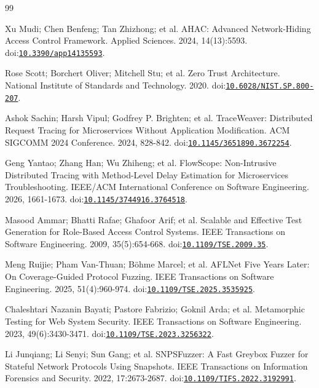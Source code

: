 \begin{thebibliography}{99}

Xu Mudi; Chen Benfeng; Tan Zhizhong; et al. AHAC: Advanced Network-Hiding Access Control Framework. Applied Sciences. 2024, 14(13):5593. doi:\href{https://doi.org/10.3390/app14135593}{\nolinkurl{10.3390/app14135593}}.

Rose Scott; Borchert Oliver; Mitchell Stu; et al. Zero Trust Architecture. National Institute of Standards and Technology. 2020. doi:\href{https://doi.org/10.6028/NIST.SP.800-207}{\nolinkurl{10.6028/NIST.SP.800-207}}.

Ashok Sachin; Harsh Vipul; Godfrey P. Brighten; et al. TraceWeaver: Distributed Request Tracing for Microservices Without Application Modification. ACM SIGCOMM 2024 Conference. 2024, 828-842. doi:\href{https://doi.org/10.1145/3651890.3672254}{\nolinkurl{10.1145/3651890.3672254}}.

Geng Yantao; Zhang Han; Wu Zhiheng; et al. FlowScope: Non-Intrusive Distributed Tracing with Method-Level Delay Estimation for Microservices Troubleshooting. IEEE/ACM International Conference on Software Engineering. 2026, 1661-1673. doi:\href{https://doi.org/10.1145/3744916.3764518}{\nolinkurl{10.1145/3744916.3764518}}.

Masood Ammar; Bhatti Rafae; Ghafoor Arif; et al. Scalable and Effective Test Generation for Role-Based Access Control Systems. IEEE Transactions on Software Engineering. 2009, 35(5):654-668. doi:\href{https://doi.org/10.1109/TSE.2009.35}{\nolinkurl{10.1109/TSE.2009.35}}.

Meng Ruijie; Pham Van-Thuan; Böhme Marcel; et al. AFLNet Five Years Later: On Coverage-Guided Protocol Fuzzing. IEEE Transactions on Software Engineering. 2025, 51(4):960-974. doi:\href{https://doi.org/10.1109/TSE.2025.3535925}{\nolinkurl{10.1109/TSE.2025.3535925}}.

Chaleshtari Nazanin Bayati; Pastore Fabrizio; Goknil Arda; et al. Metamorphic Testing for Web System Security. IEEE Transactions on Software Engineering. 2023, 49(6):3430-3471. doi:\href{https://doi.org/10.1109/TSE.2023.3256322}{\nolinkurl{10.1109/TSE.2023.3256322}}.

Li Junqiang; Li Senyi; Sun Gang; et al. SNPSFuzzer: A Fast Greybox Fuzzer for Stateful Network Protocols Using Snapshots. IEEE Transactions on Information Forensics and Security. 2022, 17:2673-2687. doi:\href{https://doi.org/10.1109/TIFS.2022.3192991}{\nolinkurl{10.1109/TIFS.2022.3192991}}.


\end{thebibliography}
